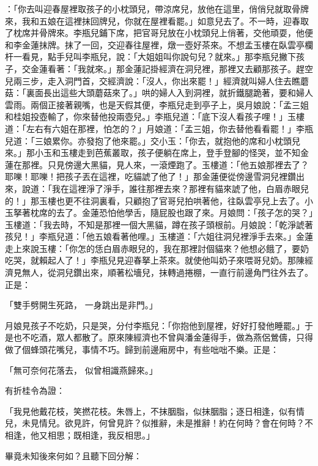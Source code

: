 ：「你去叫迎春屋裡取孩子的小枕頭兒，帶涼席兒，放他在這里，俏俏兒就取骨牌來，我和五娘在這裡抹回牌兒，你就在屋裡看罷。」如意兒去了。不一時，迎春取了枕席并骨牌來。李瓶兒鋪下席，把官哥兒放在小枕頭兒上俏著，交他頑耍，他便和李金蓮抹牌。抹了一回，交迎春往屋裡，燉一壺好茶來。不想孟玉樓在臥雲亭欄杆一看見，點手兒叫李瓶兒，說：「大姐姐叫你說句兒？就來。」那李瓶兒撇下孩子，交金蓮看著：「我就來。」那金蓮記掛經濟在洞兒裡，那裡又去顧那孩子。趕空兒兩三步，走入洞門首，交經濟說：「沒人，你出來罷！」經濟就叫婦人住去瞧蘑菇：「裏面長出這些大頭蘑菇來了。」哄的婦人入到洞裡，就折鐵腿跪著，要和婦人雲雨。兩個正接著親嘴，也是天假其便，李瓶兒走到亭子上，吳月娘說：「孟三姐和桂姐投壺輸了，你來替他投兩壺兒。」李瓶兒道：「底下沒人看孩子哩！」玉樓道：「左右有六姐在那裡，怕怎的？」月娘道：「孟三姐，你去替他看看罷！」李瓶兒道：「三娘累你。亦發抱了他來罷。」交小玉：「你去，就抱他的席和小枕頭兒來。」那小玉和玉樓走到芭蕉叢取，孩子便躺在席上，登手登腳的怪哭，並不知金蓮在那裡。只見傍邊大黑貓，見人來，一滾煙跑了。玉樓道：「他五娘那裡去了？耶嚛！耶嚛！把孩子丟在這裡，吃貓諕了他了！」那金蓮便從傍邊雪洞兒裡鑽出來，說道：「我在這裡淨了淨手，誰往那裡去來？那裡有貓來諕了他，白眉赤眼兒的！」那玉樓也更不往洞裏看，只顧抱了官哥兒拍哄著他，往臥雲亭兒上去了。小玉拏著枕席的去了。金蓮恐怕他學舌，隨屁股也跟了來。月娘問：「孩子怎的哭？」玉樓道：「我去時，不知是那裡一個大黑貓，蹲在孩子頭根前。月娘說：「乾淨諕著孩兒！」李瓶兒道：「他五娘看著他哩。」玉樓道：「六姐往洞兒裡淨手去來。」金蓮走上來說玉樓：「你怎的恁白眉赤眼兒的，我在那裡討個貓來？他想必餓了，要奶吃哭，就賴起人了！」李瓶兒見迎春拏上茶來。就使他叫奶子來喂哥兒奶。那陳經濟見無人，從洞兒鑽出來，順著松墻兒，抹轉過捲棚，一直行前邊角門往外去了。正是：

「雙手劈開生死路，  一身跳出是非門。」

月娘見孩子不吃奶，只是哭，分付李瓶兒：「你抱他到屋裡，好好打發他睡罷。」于是也不吃酒，眾人都散了。原來陳經濟也不曾與潘金蓮得手，做為燕侶鶯儔，只得做了個蜂頭花嘴兒，事情不巧。歸到前邊廂房中，有些咄咄不樂。正是：

「無可奈何花落去，  似曾相識燕歸來。」

有折桂令為證：

「我見他戴花枝，笑撚花枝。朱唇上，不抹胭脂，似抹胭脂；逐日相逢，似有情兒，未見情兒。欲見許，何曾見許？似推辭，未是推辭！約在何時？會在何時？不相逢，他又相思；既相逢，我反相思。」

畢竟未知後來何如？且聽下回分解：

